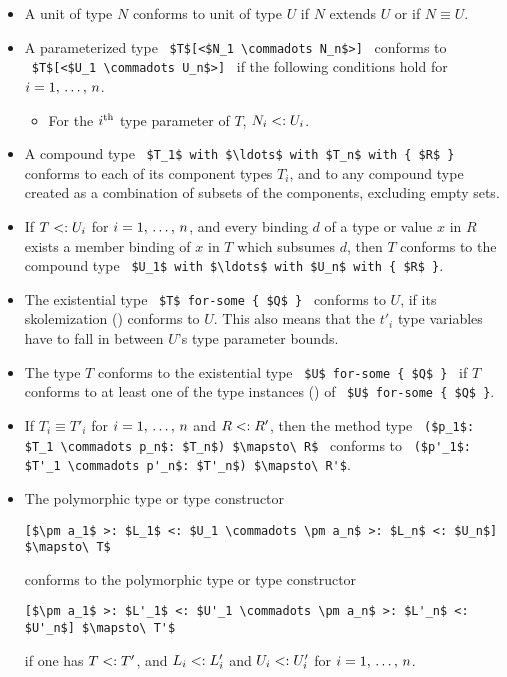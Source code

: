 \begin{itemize}
\item
A unit of type $N$ conforms to unit of type $U$ if $N$ extends $U$ or if $N \equiv U$. 

\item
A parameterized type ~\lstinline!$T$[<$N_1 \commadots N_n$>]!~ conforms to ~\lstinline!$T$[<$U_1 \commadots U_n$>]!~ if the following conditions hold for $i = 1 ,\, \ldots ,\, n$.
\begin{itemize}
\item For the $i^{\mbox{\scriptsize th}}$ type parameter of $T$, $N_i <: U_i$.
\end{itemize}

\item 
A compound type ~\lstinline!$T_1$ with $\ldots$ with $T_n$ with { $R$ }!~ conforms to each of its component types $T_i$, and to any compound type created as a combination of subsets of the components, excluding empty sets. 

\item 
If $T <: U_i$ for $i = 1 ,\, \ldots ,\, n$, and every binding $d$ of a type or value $x$ in $R$ exists a member binding of $x$ in $T$ which subsumes $d$, then $T$ conforms to the compound type ~\lstinline!$U_1$ with $\ldots$ with $U_n$ with { $R$ }!. 

\item
The existential type ~\lstinline!$T$ for-some { $Q$ }!~ conforms to $U$, if its skolemization () conforms to $U$. This also means that the $t'_i$ type variables have to fall in between $U$'s type parameter bounds. 

\item
The type $T$ conforms to the existential type ~\lstinline!$U$ for-some { $Q$ }!~ if $T$ conforms to at least one of the type instances () of ~\lstinline!$U$ for-some { $Q$ }!. 

\item
If $T_i \equiv T'_i$ for $i = 1 ,\, \ldots ,\, n$ and $R <: R'$, then the method type ~\lstinline!($p_1$: $T_1 \commadots p_n$: $T_n$) $\mapsto\ R$!~ conforms to ~\lstinline!($p'_1$: $T'_1 \commadots p'_n$: $T'_n$) $\mapsto\ R'$!. 

\item
The polymorphic type or type constructor 
\begin{lstlisting}
[$\pm a_1$ >: $L_1$ <: $U_1 \commadots \pm a_n$ >: $L_n$ <: $U_n$] $\mapsto\ T$
\end{lstlisting}
conforms to the polymorphic type or type constructor 
\begin{lstlisting}
[$\pm a_1$ >: $L'_1$ <: $U'_1 \commadots \pm a_n$ >: $L'_n$ <: $U'_n$] $\mapsto\ T'$
\end{lstlisting}
if one has $T <: T'$, and $L_i <: L'_i$ and $U_i <: U'_i$ for $i = 1 ,\, \ldots ,\, n$. 


\end{itemize}

